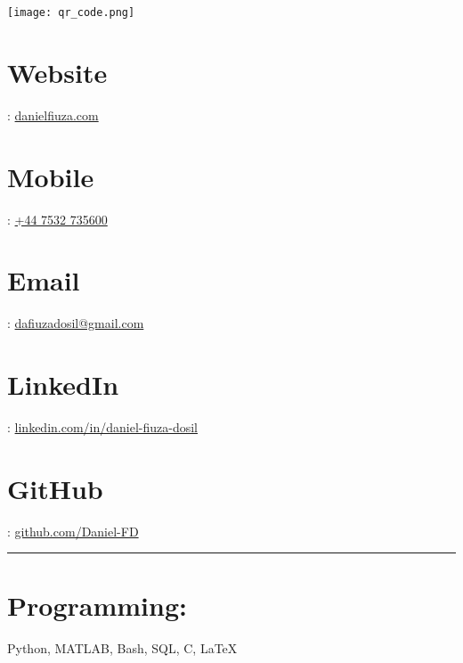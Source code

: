 \documentclass[print]{cv-style}          %
\begin{document}
\newcommand{\ignore}[1]{}


\begin{aside}
\vspace{-1.4cm}
\begin{flushright}
\texttt{[image: qr\_code.png]}
\end{flushright}
\section{Website \href{https://danielfiuza.com/}{\faGlobe}}:
\href{https://danielfiuza.com/}{danielfiuza.com}
%
\section{Mobile \href{tel:+447532735600}{\faMobile}}:
\href{tel:+447532735600}{+44 7532 735600}
%
\section{Email \href{mailto:dafiuzadosil@gmail.com}{\faEnvelope}}:
\href{mailto:dafiuzadosil@gmail.com}{dafiuzadosil@gmail.com}
%
\section{LinkedIn \href{https://www.linkedin.com/in/daniel-fiuza-dosil}{\faLinkedin}}:
\href{https://www.linkedin.com/in/daniel-fiuza-dosil}{\faLinkedin\hspace{0.2em}linkedin.com/in/daniel-fiuza-dosil}
%
\section{GitHub \href{https://github.com/Daniel-FD}{\faGithub}}:
\href{https://github.com/Daniel-FD}{\faGithub\hspace{0.2em}github.com/Daniel-FD}

\vspace{1cm}
\hrule
\vspace{0.5cm}
%
\section{Programming:}
Python, MATLAB, Bash, SQL, C, \LaTeX


\end{aside}
\end{document}
